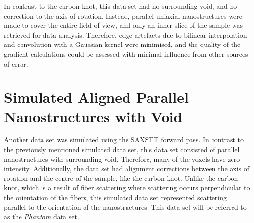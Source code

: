 In contrast to the carbon knot, this data set had no surrounding void, and no correction to the axis of rotation.
Instead, parallel uniaxial nanostructures were made to cover the entire field of view, and only an inner slice of the sample was retrieved for data analysis.
Therefore, edge artefacts due to bilinear interpolation and convolution with a Gaussian kernel were minimised,
and the quality of the gradient calculations could be assessed with minimal influence from other sources of error.




\section{Simulated Aligned Parallel Nanostructures with Void}
\label{sec:aligned_parallel_nanostructures_in_air}
Another data set was simulated using the SAXSTT forward pass. In contrast to the previously mentioned simulated data set,
this data set consisted of parallel nanostructures with surrounding void. Therefore, many of the voxels have zero intensity.
Additionally, the data set had alignment corrections between the axis of rotation and the centre of the sample, like the carbon knot.
Unlike the carbon knot, which is a result of fiber scattering where scattering occurs perpendicular to the orientation of the fibers,
this simulated data set represented scattering parallel to the orientation of the nanostructures.
This data set will be referred to as the \emph{Phantom} data set.


